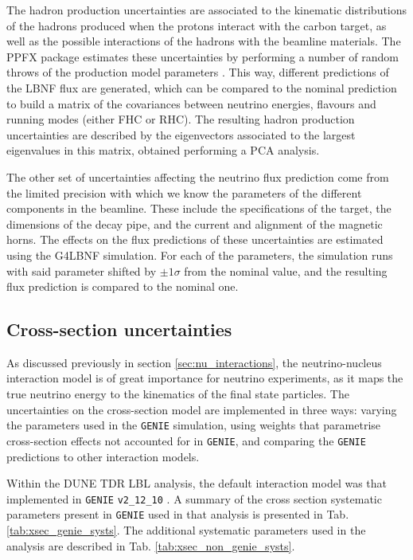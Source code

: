 The hadron production uncertainties are associated to the kinematic distributions of the hadrons produced when the protons interact with the carbon target, as well as the possible interactions of the hadrons with the beamline materials. The PPFX package estimates these uncertainties by performing a number of random throws of the production model parameters \cite{Bashyal2017}. This way, different predictions of the LBNF flux are generated, which can be compared to the nominal prediction to build a matrix of the covariances between neutrino energies, flavours and running modes (either FHC or RHC). The resulting hadron production uncertainties are described by the eigenvectors associated to the largest eigenvalues in this matrix, obtained performing a PCA analysis.

The other set of uncertainties affecting the neutrino flux prediction come from the limited precision with which we know the parameters of the different components in the beamline. These include the specifications of the target, the dimensions of the decay pipe, and the current and alignment of the magnetic horns. The effects on the flux predictions of these uncertainties are estimated using the G4LBNF simulation. For each of the parameters, the simulation runs with said parameter shifted by $\pm 1\sigma$ from the nominal value, and the resulting flux prediction is compared to the nominal one.

\subsection{Cross-section uncertainties}

As discussed previously in section \ref{sec:nu_interactions}, the neutrino-nucleus interaction model is of great importance for neutrino experiments, as it maps the true neutrino energy to the kinematics of the final state particles. The uncertainties on the cross-section model are implemented in three ways: varying the parameters used in the \texttt{GENIE} simulation, using weights that parametrise cross-section effects not accounted for in \texttt{GENIE}, and comparing the \texttt{GENIE} predictions to other interaction models.

Within the DUNE TDR LBL analysis, the default interaction model was that implemented in \texttt{GENIE} \texttt{v2_12_10} \cite{DUNE2021}. A summary of the cross section systematic parameters present in \texttt{GENIE} used in that analysis is presented in Tab. \ref{tab:xsec_genie_systs}. The additional systematic parameters used in the analysis are described in Tab. \ref{tab:xsec_non_genie_systs}.

